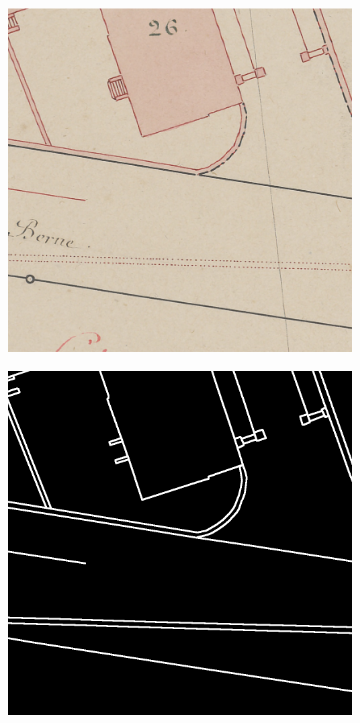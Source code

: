 \documentclass[12pt]{article}
\begin{document}
\begin{figure}[H]
    \begin{subfigure}[b]{.28\textwidth}
		\begin{minipage}[t]{1\linewidth}
			\centering
			\includegraphics[width=1\linewidth]{images/patches/img6.png}
		\end{minipage}
	\end{subfigure}
	\begin{subfigure}[b]{.28\textwidth}
		\begin{minipage}[t]{1\linewidth}
			\centering
			\includegraphics[width=1\linewidth]{images/patches/gt6.png}

\end{minipage}
\end{subfigure}
\end{figure}
\end{document}

